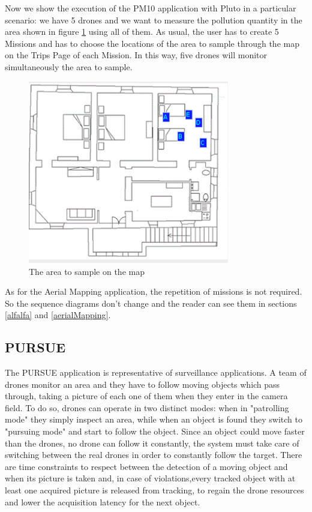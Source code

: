 Now we show the execution of the PM10 application with Pluto in a particular scenario:
we have 5 drones and we want to measure the pollution quantity in the area shown in figure \ref{fig:pm10Area} using all of them.
As usual, the user has to create 5 Missions and has to choose the locations of the area to sample through the map on the Trips Page of each Mission.
In this way, five drones will monitor simultaneously the area to sample.

\begin{figure}[H]
\centering
\includegraphics[width=\linewidth, height=8cm]{pictures/pm10Area.png}
\caption{The area to sample on the map}
\label{fig:pm10Area}
\end{figure}

As for the Aerial Mapping\cite{putti} application, the repetition of missions is not required.
So the sequence diagrams don't change and the reader can see them in sections \ref{alfalfa} and \ref{aerialMapping}.


\subsection{PURSUE}\label{PURSUE}


The PURSUE application\cite{pursue} is representative of surveillance applications. A team of drones monitor an area and they have to follow moving objects which pass through, taking a picture of each one of them when they enter in the camera field.
To do so, drones can operate in two distinct modes: when in "patrolling mode" they simply inspect an area, while when an object is found they switch to "pursuing mode" and start to follow the object.
Since an object could move faster than the drones, no drone can follow it constantly, the system must take care of switching between the real drones in order to constantly follow the target.
There are time constraints to respect between the detection of a moving object and when its picture is taken and, in case of violations,every tracked object with at least one acquired picture is released from tracking, to regain the drone resources and lower the acquisition latency for the next object.
\\

